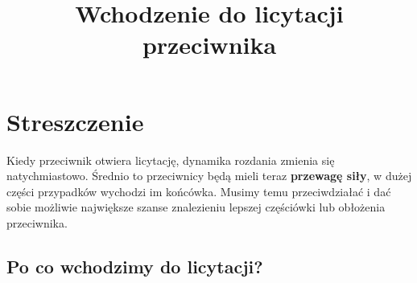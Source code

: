 \documentclass[12pt, a4paper]{article}
\title{\vspace{-2cm}Wchodzenie do licytacji przeciwnika}
\author{}
\date{}
\begin{document}
    \maketitle
    \section{Streszczenie}
    Kiedy przeciwnik otwiera licytację, dynamika rozdania zmienia się natychmiastowo.
    Średnio to przeciwnicy będą mieli teraz \textbf{przewagę siły}, w dużej części przypadków
    wychodzi im końcówka. Musimy temu przeciwdziałać i dać sobie możliwie największe szanse
    znalezieniu lepszej częściówki lub obłożenia przeciwnika. 

    \subsection{Po co wchodzimy do licytacji?}
\end{document}
